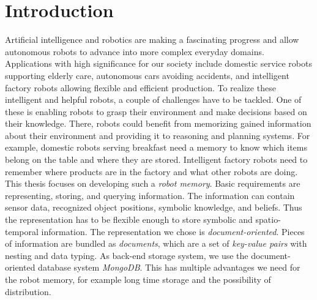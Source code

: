 \chapter{Introduction}
\label{chap:introduction}
Artificial intelligence and robotics are making a fascinating progress
and allow autonomous robots to advance into more complex everyday domains.
Applications with high significance for our society include domestic
service robots supporting elderly care, autonomous cars avoiding
accidents, and intelligent factory robots allowing flexible and
efficient production. To realize these intelligent and helpful robots,
a couple of challenges have to be tackled. One of these is enabling
robots to grasp their environment and make decisions based on their
knowledge. There, robots could benefit from memorizing gained information
about their environment and providing it to reasoning and planning
systems. For example, domestic robots serving breakfast need a memory
to know which items belong on the table and where they are
stored. Intelligent factory robots need to remember where products are
in the factory and what other robots are doing.
%
This thesis focuses on developing such a \emph{robot memory}. Basic
requirements are representing, storing, and querying information. The
information can contain sensor data, recognized object positions,
symbolic knowledge, and beliefs. Thus the representation has to be
flexible enough to store symbolic and spatio-temporal information. The
representation we chose is \emph{document-oriented}. Pieces of
information are bundled as \emph{documents}, which are a set of
\emph{key-value pairs} with nesting and data typing. As
back-end storage system, we use the document-oriented database system
\emph{MongoDB}. This has multiple advantages we need for the robot
memory, for example long time storage and the possibility of
distribution.

